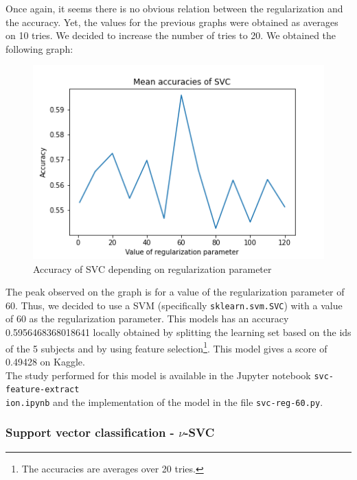 \documentclass[a4paper, 11pt, oneside]{article}
\begin{document}
Once again, it seems there is no obvious relation between the regularization and the accuracy. Yet, the values for the previous graphs were obtained as averages on 10 tries. We decided to increase the number of tries to 20. We obtained the following graph:
\begin{figure}[H]
\centering
\includegraphics[scale=0.4]{svm/svm_svc_accuracies_4.png}
\caption{Accuracy of SVC depending on regularization parameter}
\end{figure}
The peak observed on the graph is for a value of the regularization parameter of 60. Thus, we decided to use a SVM (specifically \texttt{sklearn.svm.SVC}) with a value of 60 as the regularization parameter. This models has an accuracy 0.5956468368018641 locally obtained by splitting the learning set based on the ids of the 5 subjects and by using feature selection\footnote{The accuracies are averages over 20 tries.}. This model gives a score of 0.49428 on Kaggle.\\
The study performed for this model is available in the Jupyter notebook \texttt{svc-feature-extract\\ion.ipynb} and the implementation of the model in the file \texttt{svc-reg-60.py}.

\subsubsection{Support vector classification - $\nu$-SVC} \label{subsubsec:nusvc}
\end{document}
